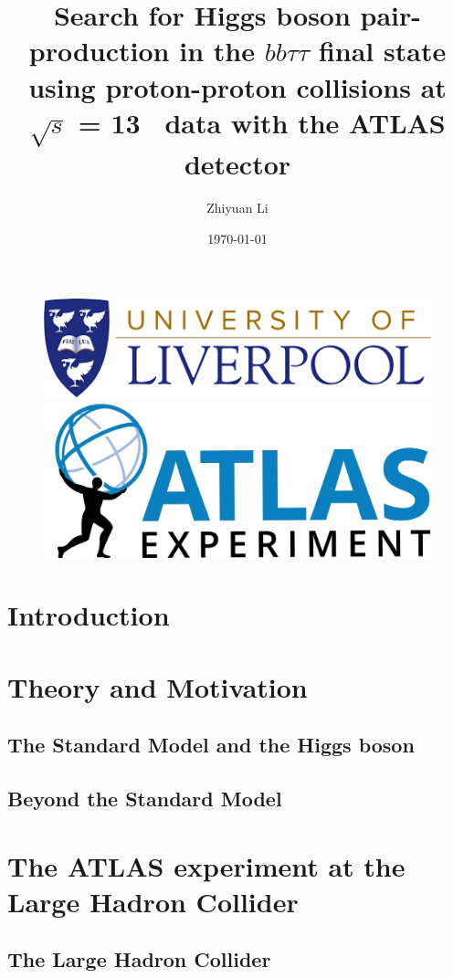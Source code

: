 \documentclass[letterpaper,12pt]{article}
\begin{document}
\title{Search for Higgs boson pair-production in the $bb\tau\tau$ final state using proton-proton collisions at $\sqrt{s}$ = 13 \TeV\ data with the ATLAS detector}%
\author{ Zhiyuan Li}
\date{\today}
\maketitle
\begin{figure}[htp]
\centering
\includegraphics[width=.5\textwidth]{logo.png}
\vspace{3em}
\centering
\includegraphics[width=.45\textwidth]{ATLAS-Logo-Ref-RGB-H_1.jpg}
\end{figure}
\newpage


\tableofcontents{}
\printindex{}


\newpage
\section{Introduction}
\section{Theory and Motivation}
\subsection{The Standard Model and the Higgs boson}
\subsection{Beyond the Standard Model}
\section{The ATLAS experiment at the Large Hadron Collider}
\subsection{The Large Hadron Collider}
\end{document}
